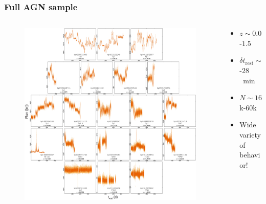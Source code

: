 \documentclass[hyperref={pdfpagelabels=false}]{beamer}
\begin{document}
\begin{frame}
\frametitle{Full AGN sample} 
  \begin{columns}
    \centering
    \begin{column}{0.65\textwidth}
      \begin{figure}
        \includegraphics[scale=0.45]{images/AllLC.jpg}
      \end{figure}
    \end{column}
    \begin{column}{0.35\textwidth}
        \begin{itemize}
        \item $z \sim 0.02$-$1.5$
        \item $\delta t_{\mathrm{rest}} \sim 14$-$28$~min
        \item $N \sim 16$k-$60$k
        \item Wide variety of behavior!
        \end{itemize}
    \end{column}
  \end{columns}
\end{frame}
\end{document}
